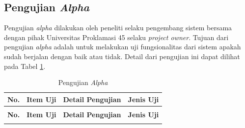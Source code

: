 	    \subsection{Pengujian \emph{Alpha}}
	    Pengujian \emph{alpha} dilakukan oleh peneliti selaku pengembang sistem bersama dengan pihak Universitas Proklamasi 45 selaku \emph{project owner}. Tujuan dari pengujian \emph{alpha} adalah untuk melakukan uji fungsionalitas dari sistem apakah sudah berjalan dengan baik atau tidak. Detail dari pengujian ini dapat dilihat pada Tabel \ref{tabel_pengujian_alpha}.
	    \begin{spacing}{1.25}
	    \begin{longtable}{|>{\centering}p{1.5em}|>{\raggedright}p{3cm}|>{\raggedright}p{6.5cm}|p{2cm}|}
    	    \caption{Pengujian \emph{Alpha}} 
	        \label{tabel_pengujian_alpha} \\
            \hline
            \textbf{No.} & \centering \textbf{Item Uji} & \centering \textbf{Detail Pengujian} & \textbf{Jenis Uji} \\
            \hline 
            \endfirsthead
                        
            \multicolumn{4}{c}{{\bfseries \tablename\ \thetable{}: }Pengujian \emph{Alpha} (lanjutan)} \\
            \hline
            \textbf{No.} & \centering \textbf{Item Uji} & \centering \textbf{Detail Pengujian} & \textbf{Jenis Uji} \\ \hline
            \endhead
            \hline
            \endfoot
            \hline \hline
            \endlastfoot
    	    

\end{longtable}
\end{spacing}
